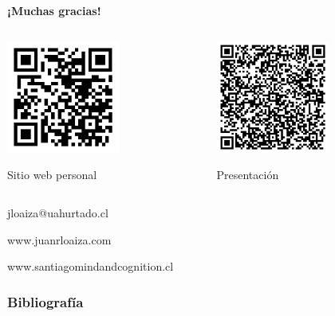 \documentclass[%
  9pt,
  spanish, %
  ignorenonframetext,
  aspectratio=169, %
]{beamer}
\begin{document}
\section{}
\begin{frame}

  \centering
  {\LARGE
  \textbf{¡Muchas gracias!}}
  \vspace{-1em}

  \begin{minipage}[t]{0.7\textwidth}
    \begin{columns}
      \begin{column}{0.5\textwidth}
        \centering
        {
          \includegraphics[height=10em]{qr_juanrloaizacom.pdf}

          Sitio web personal
        }
      \end{column}

      \begin{column}{0.5\textwidth}
        \centering
        {
          \includegraphics[height=10em]{linkppt.pdf}

          Presentación
        }
      \end{column}
    \end{columns}
  \end{minipage}


  jloaiza@uahurtado.cl

  www.juanrloaiza.com

  www.santiagomindandcognition.cl

\end{frame}

\begin{frame}[allowframebreaks]
  \frametitle{Bibliografía}
  \printbibliography
\end{frame}
\end{document}

